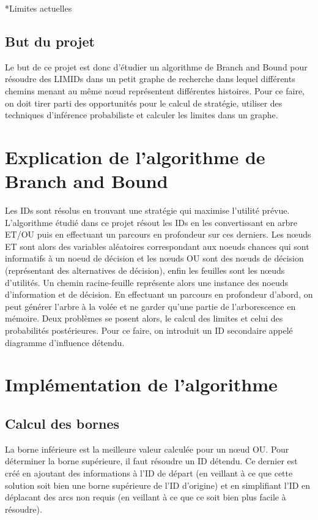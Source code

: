 \documentclass[12pt]{article}
\begin{document}
*Limites actuelles

\subsection{But du projet}
Le but de ce projet est donc d'étudier un algorithme de Branch and Bound pour résoudre des LIMIDs dans un petit graphe de recherche dans lequel différents chemins menant au même nœud représentent différentes histoires.
Pour ce faire, on doit tirer parti des opportunités pour le calcul de stratégie, utiliser des techniques d'inférence probabiliste et calculer les limites dans un graphe.

\pagebreak
\section{Explication de l'algorithme de Branch and Bound}
Les IDs sont résolus en trouvant une stratégie qui maximise l'utilité prévue.
L'algorithme étudié dans ce projet résout les IDs en les convertissant en arbre ET/OU puis en effectuant un parcours en profondeur sur ces derniers.
Les nœuds ET sont alors des variables aléatoires correspondant aux noeuds chances qui sont informatifs à un noeud de décision et les nœuds OU sont des nœuds de décision (représentant des alternatives de décision), enfin les feuilles sont les nœuds d'utilités.
Un chemin racine-feuille représente alors une instance des noeuds d'information et de décision.
En effectuant un parcours en profondeur d'abord, on peut générer l'arbre à la volée et ne garder qu'une partie de l'arborescence en mémoire.
Deux problèmes se posent alors, le calcul des limites et celui des probabilités postérieures.
Pour ce faire, on introduit un ID secondaire appelé diagramme d'influence détendu.

\section{Implémentation de l'algorithme}

\subsection{Calcul des bornes}
La borne inférieure est la meilleure valeur calculée pour un nœud OU.
Pour déterminer la borne supérieure, il faut résoudre un ID détendu. 
Ce dernier est créé en ajoutant des informations à l'ID de départ (en veillant à ce que cette solution soit bien une borne supérieure de l'ID d'origine) et en simplifiant l'ID en déplacant des arcs non requis (en veillant à ce que ce soit bien plus facile à résoudre).
\end{document}
